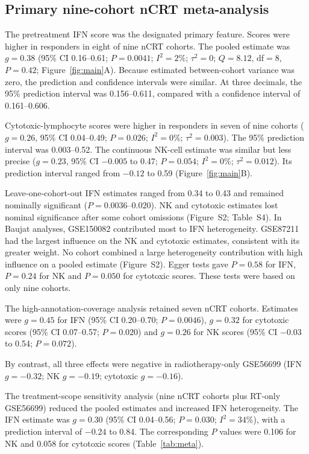 \documentclass[11pt,a4paper]{article}
\begin{document}
\subsection{Primary nine-cohort nCRT meta-analysis}

The pretreatment IFN score was the designated primary feature. Scores were higher in responders in eight of nine nCRT cohorts. The pooled estimate was $g=0.38$ (95\% CI 0.16--0.61; $P=0.0041$; $I^2=2\%$; $\tau^2=0$; $Q=8.12$, df$=8$, $P=0.42$; Figure~\ref{fig:main}A). Because estimated between-cohort variance was zero, the prediction and confidence intervals were similar. At three decimals, the 95\% prediction interval was 0.156--0.611, compared with a confidence interval of 0.161--0.606.

Cytotoxic-lymphocyte scores were higher in responders in seven of nine cohorts ($g=0.26$, 95\% CI 0.04--0.49; $P=0.026$; $I^2=0\%$; $\tau^2=0.003$). The 95\% prediction interval was 0.003--0.52. The continuous NK-cell estimate was similar but less precise ($g=0.23$, 95\% CI $-0.005$ to 0.47; $P=0.054$; $I^2=0\%$; $\tau^2=0.012$). Its prediction interval ranged from $-0.12$ to 0.59 (Figure~\ref{fig:main}B).

Leave-one-cohort-out IFN estimates ranged from 0.34 to 0.43 and remained nominally significant ($P=0.0036$--$0.020$). NK and cytotoxic estimates lost nominal significance after some cohort omissions (Figure~S2; Table~S4). In Baujat analyses, GSE150082 contributed most to IFN heterogeneity. GSE87211 had the largest influence on the NK and cytotoxic estimates, consistent with its greater weight. No cohort combined a large heterogeneity contribution with high influence on a pooled estimate (Figure~S2). Egger tests gave $P=0.58$ for IFN, $P=0.24$ for NK and $P=0.050$ for cytotoxic scores. These tests were based on only nine cohorts.

The high-annotation-coverage analysis retained seven nCRT cohorts. Estimates were $g=0.45$ for IFN (95\% CI 0.20--0.70; $P=0.0046$), $g=0.32$ for cytotoxic scores (95\% CI 0.07--0.57; $P=0.020$) and $g=0.26$ for NK scores (95\% CI $-0.03$ to 0.54; $P=0.072$).

By contrast, all three effects were negative in radiotherapy-only GSE56699 (IFN $g=-0.32$; NK $g=-0.19$; cytotoxic $g=-0.16$).

The treatment-scope sensitivity analysis (nine nCRT cohorts plus RT-only GSE56699) reduced the pooled estimates and increased IFN heterogeneity. The IFN estimate was $g=0.30$ (95\% CI 0.04--0.56; $P=0.030$; $I^2=34\%$), with a prediction interval of $-0.24$ to 0.84. The corresponding $P$ values were 0.106 for NK and 0.058 for cytotoxic scores (Table~\ref{tab:meta}).
\end{document}
